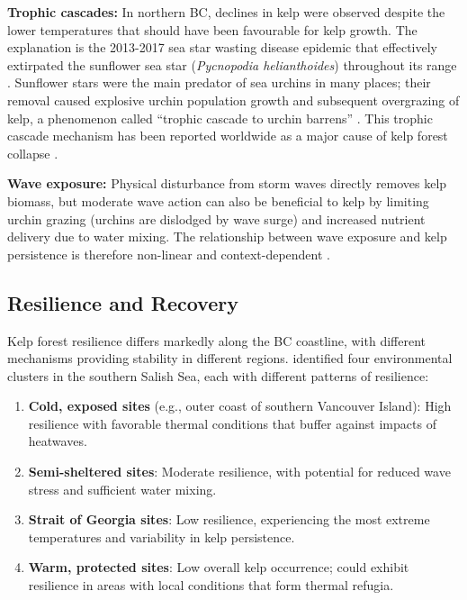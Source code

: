 \documentclass[12pt,oneside]{book}
\begin{document}
\textbf{Trophic cascades:} In northern BC, declines in kelp were observed despite the lower temperatures that should have been favourable for kelp growth. The explanation is the 2013-2017 sea star wasting disease epidemic that effectively extirpated the sunflower sea star (\textit{Pycnopodia helianthoides}) throughout its range \citep{Hamilton2021, Harvell2019}. Sunflower stars were the main predator of sea urchins in many places; their removal caused explosive urchin population growth and subsequent overgrazing of kelp, a phenomenon called ``trophic cascade to urchin barrens'' \citep{Burt2018, EstesDuggins1995, Ling2015}. This trophic cascade mechanism has been reported worldwide as a major cause of kelp forest collapse \citep{Ling2009, EstesPalmisano1974}.

\textbf{Wave exposure:} Physical disturbance from storm waves directly removes kelp biomass, but moderate wave action can also be beneficial to kelp by limiting urchin grazing (urchins are dislodged by wave surge) and increased nutrient delivery due to water mixing. The relationship between wave exposure and kelp persistence is therefore non-linear and context-dependent \citep{Starko2024}.

\subsection{Resilience and Recovery}
\label{subsec:resilience}

Kelp forest resilience differs markedly along the BC coastline, with different mechanisms providing stability in different regions. \citet{MoraSoto2024} identified four environmental clusters in the southern Salish Sea, each with different patterns of resilience:

\begin{enumerate}
    \item \textbf{Cold, exposed sites} (e.g., outer coast of southern Vancouver Island): High resilience with favorable thermal conditions that buffer against impacts of heatwaves.

    \item \textbf{Semi-sheltered sites}: Moderate resilience, with potential for reduced wave stress and sufficient water mixing.

    \item \textbf{Strait of Georgia sites}: Low resilience, experiencing the most extreme temperatures and variability in kelp persistence.

    \item \textbf{Warm, protected sites}: Low overall kelp occurrence; could exhibit resilience in areas with local conditions that form thermal refugia.
\end{enumerate}
\end{document}
